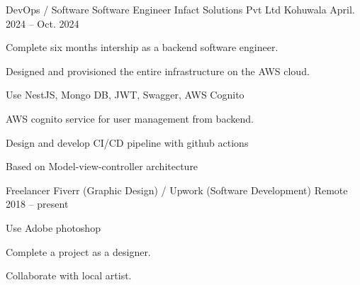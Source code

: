 

\begin{cventries}

  \cventry
    {DevOps / Software Software Engineer} %
    {Infact Solutions Pvt Ltd} %
    {Kohuwala} %
    {April. 2024 -- Oct. 2024} %

    {
      \begin{cvitems} %
        \item {Complete six months intership as a backend software engineer.}
        \item {Designed and provisioned the entire infrastructure on the AWS cloud.}
        \item {Use NestJS, Mongo DB, JWT, Swagger, AWS Cognito}
        \item {AWS cognito service for user management from backend.}
        \item {Design and develop CI/CD pipeline with github actions}
        \item {Based on Model-view-controller architecture}
      \end{cvitems}
    }

  \cventry
    {Freelancer} %
    {Fiverr (Graphic Design) / Upwork (Software Development)} %
    {Remote}
    {2018 -- present} %
    {
      \begin{cvitems} %
        \item {Use Adobe photoshop}
        \item {Complete a project as a designer.}
        \item {Collaborate with local artist.}
      \end{cvitems}
    }

\end{cventries}
